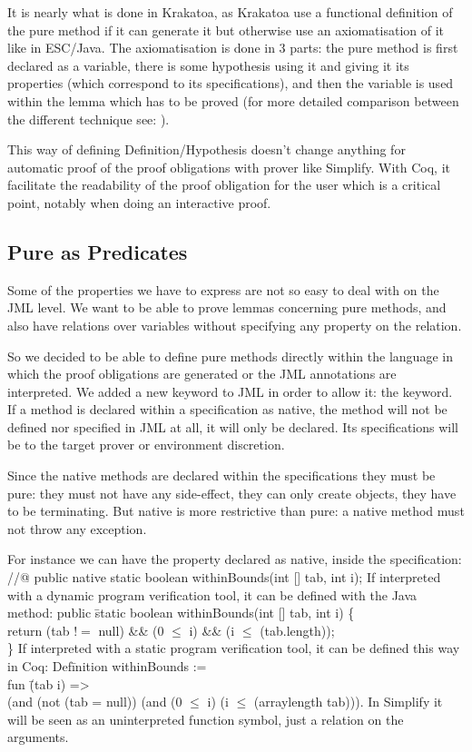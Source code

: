 It is nearly what is done in Krakatoa\cite{MPMU-04-JLAP}, as
Krakatoa use a functional definition of the pure method if it can generate it
but otherwise use an axiomatisation of it like in ESC/Java\cite{COKK-04-ESCJ}.
The axiomatisation is done in 3 parts: the pure method is first declared as a variable, 
there is some hypothesis  using it and giving it its properties (which correspond to its
specifications), and then the variable
is used within the lemma which has to be proved (for more detailed comparison between 
the different technique see: \cite{COK-04-METH,DarvasMueller-05}).

This way of defining Definition/Hypothesis doesn't change anything for automatic 
proof of the proof obligations with prover like Simplify. 
With Coq,
it facilitate the readability of the proof obligation for the user which 
is a critical point, notably when doing an interactive proof.

\subsection{Pure as Predicates}
Some of the properties we have to express are not so easy to deal with on the JML level. 
We want to be able to prove lemmas concerning pure methods, and also have 
relations over  variables without specifying any property on the relation. 

So we decided to be able to define pure methods directly within the language in which the proof 
obligations are generated or the JML annotations are interpreted. 
We added a new keyword to JML in order to allow it: the  keyword. 
If a method is declared within a specification as native, the method will not be defined nor specified
 in JML at all, it will only be declared. Its specifications will be to the target prover or environment 
discretion.

Since the native methods are declared within the specifications they must 
be pure: they must not have any side-effect, they can only create objects, 
they have to be terminating. 
But native is more restrictive than pure: 
a native method must not throw any exception.


For instance we can have the property  declared as native, inside the specification:
\btab
//@ public native static boolean withinBounds(int [] tab, int i); 
\etab
If interpreted with a dynamic program verification tool, it
can be defined with the Java method:
\btab
public \= static boolean withinBounds(int [] tab, int i) \{\+\\
    return (tab $!=$ null) \&\& (0 $\le$ i) \&\& (i $\le$ (tab.length));\-\\
\}
\etab
If interpreted with a static program verification tool,
it can be defined this way in Coq:
\btab
Def\=inition withinBounds := \+\\
fun \= (tab i) =>\+\\
       (and (not (tab = null)) (and (0 $\le$ i) (i $\le$ (arraylength tab))).
\etab
In Simplify it will be seen as an uninterpreted function symbol, just a relation on the arguments.

